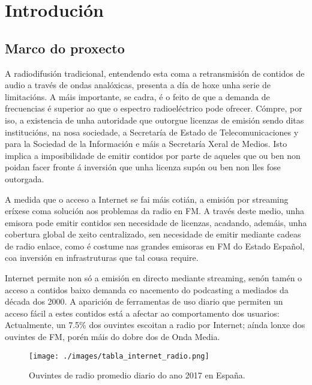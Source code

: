 \chapter[Introducción]{
  \label{chp:introduccion}
  Introdución
}
\minitoc
\newpage


\section{Marco do proxecto}

A radiodifusión tradicional, entendendo esta coma a retransmisión de contidos de audio a través de ondas analóxicas, presenta a día de hoxe unha serie de limitacións. A máis importante, se cadra, é o feito de que a demanda de frecuencias é superior ao que o espectro radioeléctrico pode ofrecer. Cómpre, por iso, a existencia de unha autoridade que outorgue licenzas de emisión sendo ditas institucións, na nosa sociedade, a Secretaría de Estado de Telecomunicaciones y para la Sociedad de la Información e máis a Secretaría Xeral de Medios\cite{BOE}. Isto implica a imposibilidade de emitir contidos por parte de aqueles que ou ben non poidan facer fronte á inversión que unha licenza supón ou ben non lles fose outorgada.

A medida que o acceso a Internet se fai máis cotián, a emisión por streaming eríxese coma solución aos problemas da radio en FM. A través deste medio, unha emisora pode emitir contidos sen necesidade de licenzas, acadando, ademáis, unha cobertura global de xeito centralizado, sen necesidade de emitir mediante cadeas de radio enlace, como é costume nas grandes emisoras en FM do Estado Español, coa inversión en infrastruturas que tal cousa require.

Internet permite non só a emisión en directo mediante streaming, senón tamén o acceso a contidos baixo demanda co nacemento do podcasting a mediados da década dos 2000\cite{guardian}. A aparición de ferramentas de uso diario que permiten un acceso fácil a estes contidos está a afectar ao comportamento dos usuarios: Actualmente, un 7.5\% dos ouvintes escoitan a radio por Internet; aínda lonxe dos ouvintes de FM, porén máis do dobre dos de Onda Media\cite{EGM}.

\begin{figure}[H]
	\centering
	\texttt{[image: ./images/tabla\_internet\_radio.png]}
  	\caption{Ouvintes de radio promedio diario do ano 2017 en España.}
	\label{fig:table_egm}
\end{figure}

